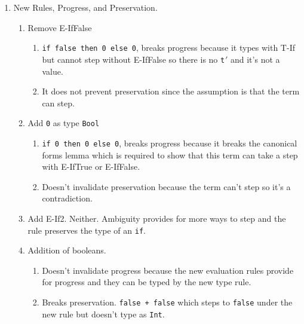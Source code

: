 \documentclass{article}
\newcommand{\term}[1]{{\tt t$_{#1}$}}
\begin{document}
\begin{enumerate}
\begin{proof}
\begin{enumerate}
\begin{enumerate}
            \item E-PlusRed: Then \verb|n|$_1$ and \verb|n|$_2$ have type \verb|Int| and the result of $[[+]]$ on two integers is again an integer \verb|n|.
          \end{enumerate}
        \item T-GT: By a similar argument replacing occurrences of ``Plus'' with ``GT'' and $+$ with $>$.
      \end{enumerate}
    \end{proof}


  \item New Rules, Progress, and Preservation.
    \begin{enumerate}
      \item Remove E-IfFalse
        \begin{enumerate}
          \item \verb|if false then 0 else 0|, breaks progress because it types with T-If but cannot step without E-IfFalse so there is no \term{}$'$ and it's not a value.
          \item It does not prevent preservation since the assumption is that the term can step.
        \end{enumerate}
      \item Add \verb|0| as type \verb|Bool|
        \begin{enumerate}
          \item \verb|if 0 then 0 else 0|, breaks progress because it breaks the canonical forms lemma which is required to show that this term can take a step with E-IfTrue or E-IfFalse.
          \item Doesn't invalidate preservation because the term can't step so it's a contradiction.
        \end{enumerate}

      \item Add E-If2. Neither. Ambiguity provides for more ways to step and the rule preserves the type of an \verb|if|.

      \item Addition of booleans.
        \begin{enumerate}
          \item Doesn't invalidate progress because the new evaluation rules provide for progress and they can be typed by the new type rule.
          \item Breaks preservation. \verb|false + false| which steps to \verb|false| under the new rule but doesn't type as \verb|Int|.
        \end{enumerate}


\end{enumerate}
\end{enumerate}
\end{document}
